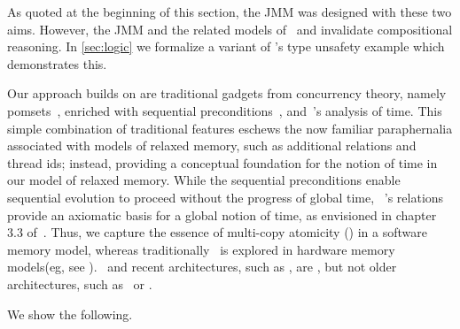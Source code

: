 As quoted at the beginning of this section, the JMM was designed with these two aims.  However, the JMM and the related models of~\citet{DBLP:conf/esop/JagadeesanPR10} and \citet{DBLP:conf/popl/KangHLVD17} invalidate compositional reasoning.  In \textsection\ref{sec:logic} we formalize a variant of \citeauthor{DBLP:journals/toplas/Lochbihler13}'s type unsafety example which demonstrates this.  

Our approach builds on are  traditional gadgets from concurrency theory, namely pomsets~\citep{Plotkin:1997:TSP:266557.266600}, enriched with sequential preconditions~\citep{Hoare:1969:ABC:363235.363259}, and~\citet{DBLP:journals/dc/Lamport86}'s  analysis of time.   This simple combination of traditional features eschews the now familiar paraphernalia associated with models of relaxed memory, such as  additional relations and thread ids; instead, providing a conceptual foundation for the notion of time in our model of relaxed memory.  While the sequential preconditions enable sequential evolution to proceed without the progress of global time, ~\citet{DBLP:journals/dc/Lamport86}'s  relations provide an axiomatic basis for a global notion of time, as envisioned in chapter 3.3 of~\citet{AlglaveThesis}.   Thus, we  capture the essence of multi-copy atomicity (\mca) in a software memory model, whereas traditionally \mca\ is explored in hardware memory models(eg, see \citet{DBLP:journals/pacmpl/PulteFDFSS18}).  
\tso\ and recent architectures, such as \armeight, are \mca, but not older architectures, such as \ppc\ or \armseven.

We show the following.



